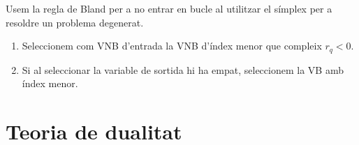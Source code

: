 \begin{prop}  \label{prop:rgl_bland}
    Usem la regla de Bland per a no entrar en bucle al utilitzar el símplex per a resoldre un problema degenerat.
    \begin{enumerate}
        \item Seleccionem com VNB d'entrada la VNB d'índex menor que compleix $r_q < 0$.
        \item Si al seleccionar la variable de sortida hi ha empat, seleccionem la VB amb índex menor.
    \end{enumerate}
\end{prop}

\section{Teoria de dualitat}

